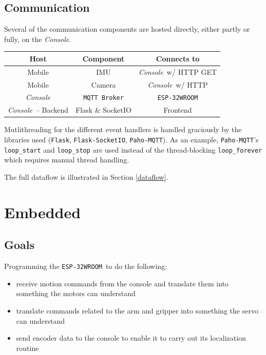 \documentclass[a4paper,12pt]{article}
\newcommand{\esp}{\texttt{ESP-32WROOM}}
\newcommand{\con}{\textit{Console}}
\begin{document}
\subsection{Communication}
Several of the communication components are hosted directly, either partly or fully, on the \con.
\begin{center}
    \bgroup
    \def\arraystretch{1.5}
    {
        \begin{tabular}{|c|c|c|}
            \hline
            \textbf{Host}    & \textbf{Component}   & \textbf{Connects to} \\
            \hline
            Mobile           & IMU                  & \con\ w/ HTTP GET    \\
            \hline
            Mobile           & Camera               & \con\ w/ HTTP        \\
            \hline
            \con             & \texttt{MQTT Broker} & \esp                 \\
            \hline
            \con\ -- Backend & Flask \& SocketIO    & Frontend             \\
            \hline
        \end{tabular}}
    \egroup
\end{center}

Mutlithreading for the different event handlers is handled graciously by the libraries used (\texttt{Flask}, \texttt{Flask-SocketIO}, \texttt{Paho-MQTT}). As an example, \texttt{Paho-MQTT}'s \texttt{loop\_start} and \texttt{loop\_stop} are used instead of the thread-blocking \texttt{loop\_forever} which requires manual thread handling.

The full dataflow is illustrated in Section \ref{dataflow}.

\section{Embedded}
\subsection*{Goals}
Programming the \esp\ to do the following:
\begin{itemize}
    \item receive motion commands from the console and translate them into something the motors can understand
    \item translate commands related to the arm and gripper into something the servo can understand
    \item send encoder data to the console to enable it to carry out its localization routine
\end{itemize}
\end{document}
